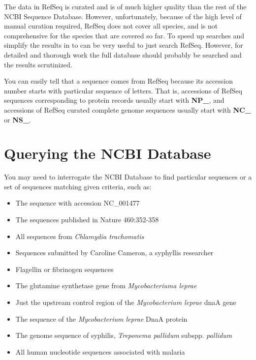 \documentclass[
]{book}
\providecommand{\tightlist}{%
  \setlength{\itemsep}{0pt}\setlength{\parskip}{0pt}}
\begin{document}
The data in RefSeq is curated and is of much higher quality than the rest of the NCBI Sequence Database. However, unfortunately, because of the high level of manual curation required, RefSeq does not cover all species, and is not comprehensive for the species that are covered so far. To speed up searches and simplify the results in to can be very useful to just search RefSeq. However, for detailed and thorough work the full database should probably be searched and the results scrutinized.

You can easily tell that a sequence comes from RefSeq because its accession number starts with particular sequence of letters. That is, accessions of RefSeq sequences corresponding to protein records usually start with \textbf{NP\_}, and accessions of RefSeq curated complete genome sequences usually start with \textbf{NC\_} or \textbf{NS\_}.

\hypertarget{querying-the-ncbi-database}{%
\section{Querying the NCBI Database}\label{querying-the-ncbi-database}}

You may need to interrogate the NCBI Database to find particular sequences or a set of sequences matching given criteria, such as:

\begin{itemize}
\tightlist
\item
  The sequence with accession NC\_001477
\item
  The sequences published in Nature 460:352-358
\item
  All sequences from \emph{Chlamydia trachomatis}
\item
  Sequences submitted by Caroline Cameron, a syphyllis researcher
\item
  Flagellin or fibrinogen sequences
\item
  The glutamine synthetase gene from \emph{Mycobacteriuma leprae}
\item
  Just the upstream control region of the \emph{Mycobacterium leprae} dnaA gene
\item
  The sequence of the \emph{Mycobacterium leprae} DnaA protein
\item
  The genome sequence of syphilis, \emph{Treponema pallidum} subspp. \emph{pallidum}
\item
  All human nucleotide sequences associated with malaria
\end{itemize}
\end{document}

